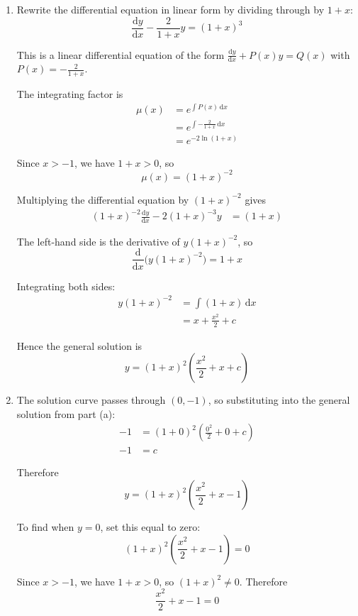 \documentclass[leqno]{article}
\begin{document}
\begin{enumerate}[
  label=\textbf{\arabic*.},
  leftmargin=*,
  topsep=0pt,
  partopsep=0pt,
  parsep=0pt
]
\vspace*{10pt}

\begin{djsSolution}
\begin{enumerate}[label=\textbf{(\alph*)}]
  \item Rewrite the differential equation in linear form by dividing through by $1+x$:
\[
\frac{\mathrm{d}y}{\mathrm{d}x}-\frac{2}{1+x}y=(1+x)^3
\]

This is a linear differential equation of the form \(\frac{\mathrm{d}y}{\mathrm{d}x}+P(x)y=Q(x)\) with \(P(x)=-\frac{2}{1+x}\).

The integrating factor is
\begin{align*}
\mu(x)&=e^{\int P(x)\,\mathrm{d}x} \\
&=e^{\int -\frac{2}{1+x}\,\mathrm{d}x} \\
&=e^{-2\ln(1+x)}
\end{align*}

Since $x>-1$, we have $1+x>0$, so
\[
\mu(x)=(1+x)^{-2}
\]

Multiplying the differential equation by $(1+x)^{-2}$ gives
\begin{align*}
(1+x)^{-2}\frac{\mathrm{d}y}{\mathrm{d}x}-2(1+x)^{-3}y&=(1+x)
\end{align*}

The left-hand side is the derivative of $y(1+x)^{-2}$, so
\[
\frac{\mathrm{d}}{\mathrm{d}x}\bigl(y(1+x)^{-2}\bigr)=1+x
\]

Integrating both sides:
\begin{align*}
y(1+x)^{-2}&=\int (1+x)\,\mathrm{d}x \\
&=x+\frac{x^2}{2}+c
\end{align*}

Hence the general solution is
\[
y=(1+x)^2\left(\frac{x^2}{2}+x+c\right)
\]

  \item The solution curve passes through $(0,-1)$, so substituting into the general solution from part (a):
\begin{align*}
-1&=(1+0)^2\left(\frac{0^2}{2}+0+c\right) \\
-1&=c
\end{align*}

Therefore
\[
y=(1+x)^2\left(\frac{x^2}{2}+x-1\right)
\]

To find when $y=0$, set this equal to zero:
\[
(1+x)^2\left(\frac{x^2}{2}+x-1\right)=0
\]

Since $x>-1$, we have $1+x>0$, so $(1+x)^2\neq 0$. Therefore
\[
\frac{x^2}{2}+x-1=0
\]


\end{enumerate}
\end{djsSolution}
\end{enumerate}
\end{document}
